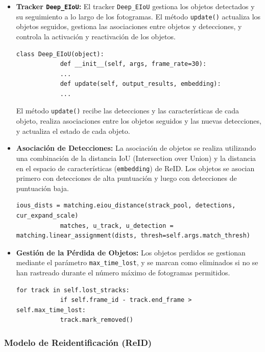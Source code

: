 \documentclass[12pt, a4paper, twoside]{article}
\begin{document}
\begin{itemize}
		\item \textbf{Tracker \texttt{Deep\_EIoU}:}  
		El tracker \texttt{Deep\_EIoU} gestiona los objetos detectados y su seguimiento a lo largo de los fotogramas. El método \texttt{update()} actualiza los objetos seguidos, gestiona las asociaciones entre objetos y detecciones, y controla la activación y reactivación de los objetos.
		\vspace{0.5cm}
		\begin{lstlisting}[style=pythonstyle]
			class Deep_EIoU(object):
			def __init__(self, args, frame_rate=30):
			...
			def update(self, output_results, embedding):
			...
		\end{lstlisting}
		\vspace{0.5cm}
		El método \texttt{update()} recibe las detecciones y las características de cada objeto, realiza asociaciones entre los objetos seguidos y las nuevas detecciones, y actualiza el estado de cada objeto.
		
		\item \textbf{Asociación de Detecciones:}  
		La asociación de objetos se realiza utilizando una combinación de la distancia IoU (Intersection over Union) y la distancia en el espacio de características (\texttt{embedding}) de ReID. Los objetos se asocian primero con detecciones de alta puntuación y luego con detecciones de puntuación baja.
		\vspace{0.5cm}
		\begin{lstlisting}[style=pythonstyle]
			ious_dists = matching.eiou_distance(strack_pool, detections, cur_expand_scale)
			matches, u_track, u_detection = matching.linear_assignment(dists, thresh=self.args.match_thresh)
		\end{lstlisting}
		
		\item \textbf{Gestión de la Pérdida de Objetos:}  
		Los objetos perdidos se gestionan mediante el parámetro \texttt{max\_time\_lost}, y se marcan como eliminados si no se han rastreado durante el número máximo de fotogramas permitidos.
		\vspace{0.5cm}
		\begin{lstlisting}[style=pythonstyle]
			for track in self.lost_stracks:
			if self.frame_id - track.end_frame > self.max_time_lost:
			track.mark_removed()
		\end{lstlisting}
	\end{itemize}
	
	\subsubsection{Modelo de Reidentificación (ReID)}
	
\end{document}
